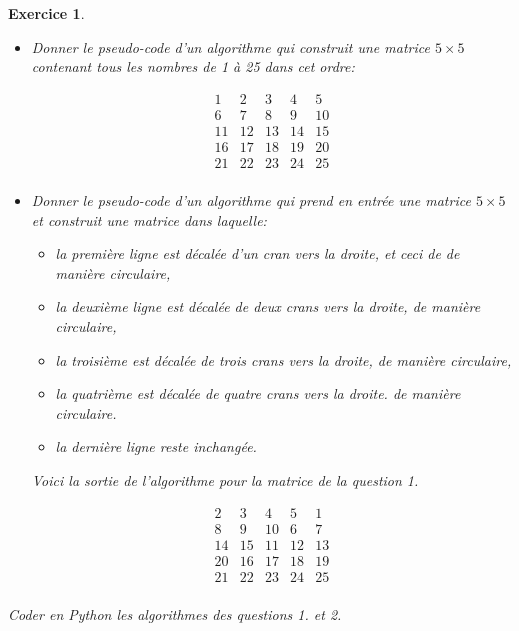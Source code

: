 \documentclass[11pt]{article}
\newtheorem{exercice}{Exercice}[section]
\begin{document}
\begin{exercice}
\begin{itemize}
\item[1.]  Donner le pseudo-code d'un algorithme  qui construit  une matrice  \(5 \times 5\) contenant tous les nombres de 1 à 25 dans cet ordre: 

\[
\begin{matrix}
1 & 2 & 3 & 4 & 5 \\
6 & 7 & 8 & 9 & 10 \\
11 & 12 & 13 & 14 & 15 \\
16 & 17 & 18 & 19 & 20\\
21 & 22 & 23 & 24 & 25\\
\end{matrix}
\]


\item[2.]  Donner le pseudo-code d'un algorithme qui prend en entrée une matrice $5 \times 5$ et  construit une matrice dans laquelle: 
\begin{itemize}
\item la première ligne est décalée d'un cran vers la droite, et ceci de de manière circulaire,
\item la deuxième ligne est décalée de deux crans vers la droite, de manière circulaire,
\item la troisième est décalée de trois crans vers la droite, de manière circulaire, 
\item la quatrième est décalée de quatre crans vers la droite. de manière circulaire. 
\item la dernière ligne reste inchangée. 
\end{itemize}

Voici la sortie de l'algorithme pour la matrice de la question 1. 

\[
\begin{matrix}
 2 & 3 & 4 & 5 & 1 \\
 8 & 9 & 10  & 6 & 7\\
 14 & 15  & 11 & 12 & 13 \\
 20 & 16 & 17 & 18 & 19 \\
21 & 22 & 23 & 24 & 25\\
\end{matrix}
\]


\end{itemize}
\item Coder en Python les algorithmes des questions 1. et 2. 

\end{exercice}
\end{document}
